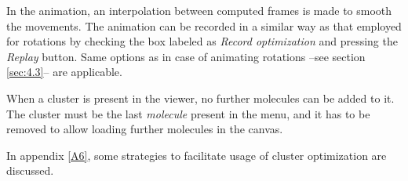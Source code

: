 \documentclass[10pt]{article}
\begin{document}
In the animation, an interpolation between computed frames is made to smooth
the movements. 
The animation can be recorded 
in a similar way as that employed for rotations
by checking the box labeled as
{\it Record optimization} and pressing the {\it Replay} button. Same options 
as in case of animating rotations --see section \ref{sec:4.3}-- are applicable.

When a cluster is present in the viewer, no further molecules can be added to it.
The cluster must be the last {\it molecule} present in the menu, and it has to be 
removed to allow loading further molecules in the canvas.

In appendix \ref{A6}, some strategies to facilitate usage of cluster optimization
are discussed.

\vspace*{5mm}
\end{document}

